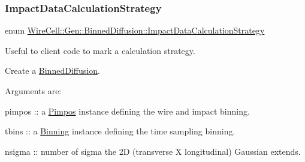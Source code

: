 \subsubsection{\texorpdfstring{Impact\+Data\+Calculation\+Strategy}{ImpactDataCalculationStrategy}}
{\footnotesize\ttfamily enum \hyperlink{class_wire_cell_1_1_gen_1_1_binned_diffusion_a96d624fc75e70453e7e29c381850d218}{Wire\+Cell\+::\+Gen\+::\+Binned\+Diffusion\+::\+Impact\+Data\+Calculation\+Strategy}}



Useful to client code to mark a calculation strategy. 

Create a \hyperlink{class_wire_cell_1_1_gen_1_1_binned_diffusion}{Binned\+Diffusion}.

Arguments are\+:


\begin{DoxyItemize}
\item pimpos \+:\+: a \hyperlink{class_wire_cell_1_1_pimpos}{Pimpos} instance defining the wire and impact binning.
\item tbins \+:\+: a \hyperlink{class_wire_cell_1_1_binning}{Binning} instance defining the time sampling binning.
\end{DoxyItemize}

nsigma \+:\+: number of sigma the 2D (transverse X longitudinal) Gaussian extends.


